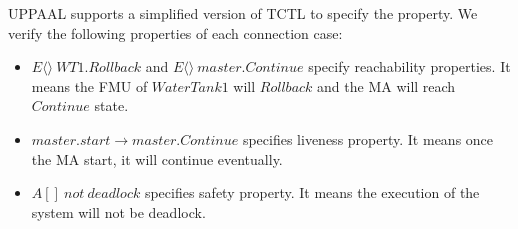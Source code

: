 UPPAAL supports a simplified version of TCTL \cite{BouchenebGR09} to specify the property. We verify the following properties of each connection case:
\begin{itemize}
\item
$E\langle\rangle~WT1.Rollback$ and $E\langle\rangle~master.Continue$ specify reachability properties. It means the FMU of $WaterTank1$ will $Rollback$ and the MA will reach $Continue$ state.
\item
$master.start \rightarrow master.Continue$ specifies liveness property. It means once the MA start, it will continue eventually.
\item 
$A[]~not~deadlock$ specifies safety property. It means the execution of the system will not be deadlock.
\end{itemize}

